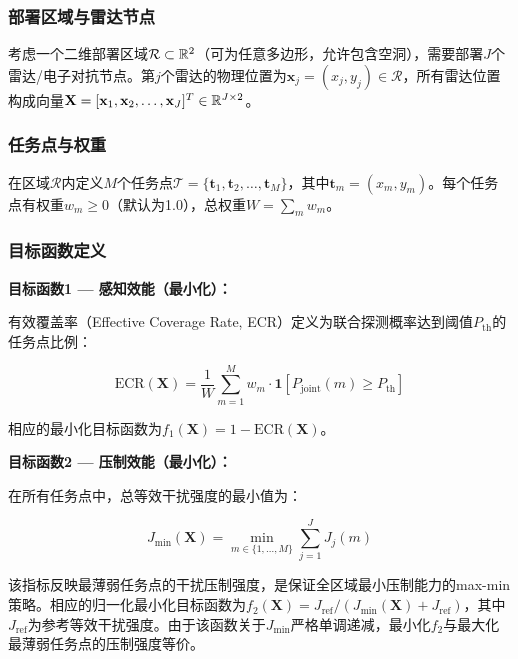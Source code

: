 \subsubsection{部署区域与雷达节点}

考虑一个二维部署区域$\mathcal{R} \subset \mathbb{R}^2$（可为任意多边形，允许包含空洞），需要部署$J$个雷达/电子对抗节点。第$j$个雷达的物理位置为$\mathbf{x}_j = (x_j, y_j) \in \mathcal{R}$，所有雷达位置构成向量$\mathbf{X} = [\mathbf{x}_1, \mathbf{x}_2, \ldots, \mathbf{x}_J]^T \in \mathbb{R}^{J \times 2}$。

\subsubsection{任务点与权重}

在区域$\mathcal{R}$内定义$M$个任务点$\mathcal{T} = \{\mathbf{t}_1, \mathbf{t}_2, \ldots, \mathbf{t}_M\}$，其中$\mathbf{t}_m = (x_m, y_m)$。每个任务点有权重$w_m \geq 0$（默认为1.0），总权重$W = \sum_m w_m$。

\subsubsection{目标函数定义}

\textbf{目标函数1 --- 感知效能（最小化）：}

有效覆盖率（Effective Coverage Rate, ECR）定义为联合探测概率达到阈值$P_{\text{th}}$的任务点比例：

\begin{equation}
\text{ECR}(\mathbf{X}) = \frac{1}{W} \sum_{m=1}^{M} w_m \cdot \mathbf{1}[P_{\text{joint}}(m) \geq P_{\text{th}}]
\label{eq:ecr}
\end{equation}

相应的最小化目标函数为$f_1(\mathbf{X}) = 1 - \text{ECR}(\mathbf{X})$。

\textbf{目标函数2 --- 压制效能（最小化）：}

在所有任务点中，总等效干扰强度的最小值为：

\begin{equation}
J_{\min}(\mathbf{X}) = \min_{m \in \{1,\ldots,M\}} \sum_{j=1}^{J} J_j(m)
\label{eq:jmin}
\end{equation}

该指标反映最薄弱任务点的干扰压制强度，是保证全区域最小压制能力的max-min策略。相应的归一化最小化目标函数为$f_2(\mathbf{X}) = J_{\text{ref}} / (J_{\min}(\mathbf{X}) + J_{\text{ref}})$，其中$J_{\text{ref}}$为参考等效干扰强度。由于该函数关于$J_{\min}$严格单调递减，最小化$f_2$与最大化最薄弱任务点的压制强度等价。


